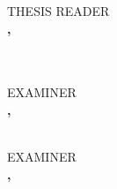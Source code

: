 \documentclass[a4paper, 12pt]{report}
\newif\ifexaminer     \examinertrue
\newif\ifexaminertwo  \examinertwofalse
\begin{document}
        \ifexaminer
            \ifexaminertwo
                \vspace{0.75 cm} 
                THESIS READER\\
                \vspace{0.1 cm} 
                    \textbf{\MakeUppercase{\reader}, \readerdegree}\\
                    \small{
                    \readerposition\\
                    \readeruniv}\\

                \vspace{0.75 cm} 
                
                \begin{minipage}[t]{.44\textwidth}\centering
                    EXAMINER\\
                    \vspace{0.1 cm} 
                    \textbf{\MakeUppercase{\examiner}, \examinerdegree}\\
                    \small{
                    \examinerposition\\
                    \examineruniv}
                \end{minipage}\hspace{.02\textwidth}
                \begin{minipage}[t]{.44\textwidth}\centering
                    EXAMINER\\
                    \vspace{0.1 cm} 
                    \textbf{\MakeUppercase{\examiner}, \examinerdegree}\\
                    \small{
                    \examinerposition\\
                    \examineruniv}
                \end{minipage}\\
\end{document}
